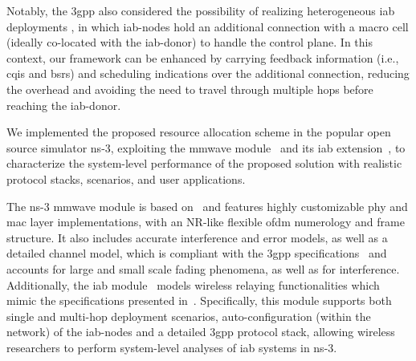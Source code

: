 Notably, the \gls{3gpp} also considered the possibility of realizing heterogeneous \gls{iab} deployments \cite{3gpp_38_874}, in which \gls{iab}-nodes hold an additional connection with a macro cell (ideally co-located with the \gls{iab}-donor) to handle the control plane. 
In this context, our framework can be enhanced by carrying feedback information (i.e., \glspl{cqi} and \glspl{bsr}) and scheduling indications over the additional connection, reducing the overhead and avoiding the need to travel through multiple hops before reaching the \gls{iab}-donor.

We implemented the proposed resource allocation scheme in the popular open source simulator ns-3, exploiting the \gls{mmwave} module~\cite{mezzavilla2018end} and its \gls{iab} extension~\cite{polese2018end}, to characterize the system-level performance of the proposed solution with realistic protocol stacks, scenarios, and user applications.

The ns-3 \gls{mmwave} module is based on~\cite{baldo2011open} and features highly customizable \gls{phy} and \gls{mac} layer implementations, with an NR-like flexible \gls{ofdm} numerology and frame structure.
It also includes accurate interference and error models, as well as a detailed channel model, which is compliant with the \gls{3gpp} specifications~\cite{zugno2020implementation} and accounts for large and small scale fading phenomena, as well as for interference.
Additionally, the \gls{iab} module~\cite{polese2018end} models wireless relaying functionalities which mimic the specifications presented in~\cite{3gpp_38_874}. Specifically, this module supports both single and multi-hop deployment scenarios, auto-configuration (within the network) of the \gls{iab}-nodes and a detailed \gls{3gpp} protocol stack, allowing wireless researchers to perform system-level analyses of \gls{iab} systems in ns-3.

